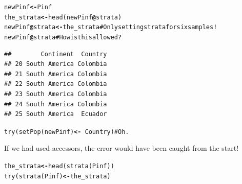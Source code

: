 \documentclass[letterpaper]{article}\usepackage[]{graphicx}\usepackage[]{color}
\makeatletter
\newcommand{\hlcom}[1]{\textcolor[rgb]{1,0.502,0}{#1}}%
\newcommand{\hlopt}[1]{\textcolor[rgb]{1,0,0.502}{\textbf{#1}}}%
\newcommand{\hlstd}[1]{\textcolor[rgb]{0,0,0}{#1}}%
\newcommand{\hlkwb}[1]{\textcolor[rgb]{0.502,0.502,0.753}{\textbf{#1}}}%
\newcommand{\hlkwc}[1]{\textcolor[rgb]{0,0.502,0.753}{#1}}%
\newcommand{\hlkwd}[1]{\textcolor[rgb]{0,0.267,0.4}{#1}}%
\newenvironment{kframe}{%
 \def\at@end@of@kframe{}%
 \ifinner\ifhmode%
  \def\at@end@of@kframe{\end{minipage}}%
  \begin{minipage}{\columnwidth}%
 \fi\fi%
 \def\FrameCommand##1{\hskip\@totalleftmargin \hskip-\fboxsep
 \colorbox{shadecolor}{##1}\hskip-\fboxsep
     \hskip-\linewidth \hskip-\@totalleftmargin \hskip\columnwidth}%
 \MakeFramed {\advance\hsize-\width
   \@totalleftmargin\z@ \linewidth\hsize
   \@setminipage}}%
 {\par\unskip\endMakeFramed%
 \at@end@of@kframe}
\newenvironment{knitrout}{}{} %
\makeatother
\begin{document}
\begin{knitrout}
\color{fgcolor}\begin{kframe}
\begin{alltt}
\hlstd{newPinf}        \hlkwb{<-} \hlstd{Pinf}
\hlstd{the_strata}     \hlkwb{<-} \hlkwd{head}\hlstd{(newPinf}\hlopt{@}\hlkwc{strata}\hlstd{)}
\hlstd{newPinf}\hlopt{@}\hlkwc{strata} \hlkwb{<-} \hlstd{the_strata}     \hlcom{# Only setting strata for six samples!}
\hlstd{newPinf}\hlopt{@}\hlkwc{strata}                   \hlcom{# How is this allowed?}
\end{alltt}
\begin{verbatim}
##        Continent  Country
## 20 South America Colombia
## 21 South America Colombia
## 22 South America Colombia
## 23 South America Colombia
## 24 South America Colombia
## 25 South America  Ecuador
\end{verbatim}
\begin{alltt}
\hlkwd{try}\hlstd{(}\hlkwd{setPop}\hlstd{(newPinf)} \hlkwb{<-} \hlopt{~}\hlstd{Country)} \hlcom{# Oh.}
\end{alltt}
\end{kframe}
\end{knitrout}
\begin{knitrout}
\color{fgcolor}\begin{kframe}


{\ttfamily\noindent\bfseries{}}\end{kframe}
\end{knitrout}


If we had used accessors, the error would have been caught from the start!

\begin{knitrout}
\color{fgcolor}\begin{kframe}
\begin{alltt}
\hlstd{the_strata}       \hlkwb{<-} \hlkwd{head}\hlstd{(}\hlkwd{strata}\hlstd{(Pinf))}
\hlkwd{try}\hlstd{(}\hlkwd{strata}\hlstd{(Pinf)} \hlkwb{<-} \hlstd{the_strata)}
\end{alltt}
\end{kframe}
\end{knitrout}
\begin{knitrout}
\color{fgcolor}\begin{kframe}


{\ttfamily\noindent\bfseries\color{errorcolor}{\#\# Error : Number of rows in data frame not equal to number of individuals in object.}}\end{kframe}
\end{knitrout}





\end{document}

